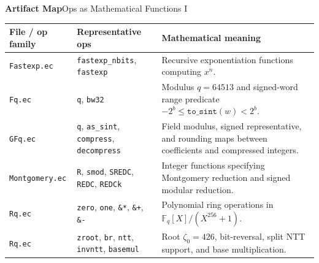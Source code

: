 \documentclass[10pt,aspectratio=1610,compress,dvipsnames]{beamer}
\newcommand{\ec}[1]{\texttt{#1}}
\begin{document}
\begin{frame}{\bfseries Artifact Map}{Ops as Mathematical Functions I}
\begin{center}
\tiny\renewcommand{\arraystretch}{1.12}
\setlength{\tabcolsep}{3pt}
\begin{tabular}{p{3.0cm}p{3.7cm}p{5.3cm}}
\toprule[1.2pt]
\textbf{File / op family} & \textbf{Representative ops} & \textbf{Mathematical meaning} \\
\midrule
\ec{Fastexp.ec} & \ec{fastexp\_nbits}, \ec{fastexp} &
Recursive exponentiation functions computing $x^n$. \\
\ec{Fq.ec} & \ec{q}, \ec{bw32} &
Modulus $q=64513$ and signed-word range predicate
$-2^b\le \mathtt{to\_sint}(w)<2^b$. \\
\ec{GFq.ec} & \ec{q}, \ec{as\_sint}, \ec{compress}, \ec{decompress} &
Field modulus, signed representative, and rounding maps between coefficients
and compressed integers. \\
\ec{Montgomery.ec} & \ec{R}, \ec{smod}, \ec{SREDC}, \ec{REDC}, \ec{REDCk} &
Integer functions specifying Montgomery reduction and signed modular reduction. \\
\ec{Rq.ec} & \ec{zero}, \ec{one}, \ec{\&*}, \ec{\&+}, \ec{\&-} &
Polynomial ring operations in $\mathbb{F}_q[X]/(X^{256}+1)$. \\
\ec{Rq.ec} & \ec{zroot}, \ec{br}, \ec{ntt}, \ec{invntt}, \ec{basemul} &
Root $\zeta_0=426$, bit-reversal, split NTT support, and base multiplication. \\
\bottomrule[1.2pt]
\end{tabular}
\end{center}
\end{frame}
\end{document}
